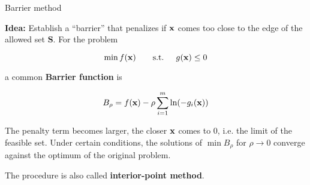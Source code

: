 \documentclass[11pt,compress,t,notes=noshow, xcolor=table]{beamer}
\begin{document}
\begin{vbframe}{Barrier method}

\textbf{Idea:} Establish a \enquote{barrier} that penalizes if $\mathbf{x}$ comes too close to the edge of the allowed set $\bm{S}$. For the problem

$$
\min f(\mathbf{x}) \qquad \text{s.t. } \quad g(\mathbf{x}) \le 0
$$

a common \textbf{Barrier function} is

$$
B_\rho = f(\mathbf{x}) - \rho \sum_{i = 1}^m \ln(-g_i(\mathbf{x}))
$$

The penalty term becomes larger, the closer $\mathbf{x}$ comes to $0$, i.e. the limit of the feasible set. Under certain conditions, the solutions of $\min B_\rho$ for $\rho\to 0$ converge against the optimum of the original problem.

\lz

The procedure is also called \textbf{interior-point method}.


\end{vbframe}








\end{document}
